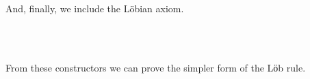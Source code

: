 \begin{code}%
\>[0]\<[2]%
\>[2] \AgdaSymbol{:}  \AgdaSymbol{\{}  \AgdaSymbol{\}}\<%
\\
\>[2]\<[4]%
\>[4]   \AgdaSymbol{(}  \AgdaSymbol{(}  \AgdaSymbol{))}\<%
\\
\>[2]\<[4]%
\>[4]   \AgdaSymbol{(}  \AgdaSymbol{)}\<%
\\
\>[2]\<[4]%
\>[4]   \AgdaSymbol{(}  \AgdaSymbol{)}\<%
\end{code}

And, finally, we include the Löbian axiom.

\begin{code}%
\>[0]\<[2]%
\>[2] \AgdaSymbol{:}  \AgdaSymbol{\{} \AgdaSymbol{\}}\<%
\\
\>[2]\<[4]%
\>[4]   \AgdaSymbol{(}  \AgdaSymbol{((}  \AgdaSymbol{)}  \AgdaSymbol{))}\<%
\\
\>[2]\<[4]%
\>[4]   \AgdaSymbol{(}  \AgdaSymbol{)}\<%
\end{code}


From these constructors we can prove the simpler form of the Lӧb rule.

\begin{code}%
\> \AgdaSymbol{:}  \AgdaSymbol{\{} \AgdaSymbol{\}}    \AgdaSymbol{((}  \AgdaSymbol{)}  \AgdaSymbol{)}    \<%
\\
\>  \AgdaSymbol{=}      \<%
\end{code}


